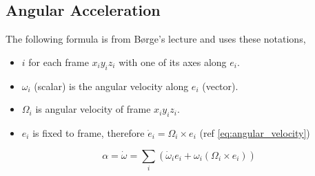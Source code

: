 \subsection{Angular Acceleration}
The following formula is from Børge's lecture and uses these notations,
\begin{itemize}
    \item $i$ for each frame $x_iy_iz_i$ with one of its axes along $e_i$.
    \item $\omega_i$ (scalar) is the angular velocity along $e_i$ (vector).
    \item $\Omega_i$ is angular velocity of frame $x_iy_iz_i$.
    \item $e_i$ is fixed to frame, therefore $\Dot{e}_i = \Omega_i \times e_i$ (ref \ref{eq:angular_velocity})
\end{itemize}

\begin{equation}
    \alpha = \Dot{\omega} = \sum_i (\Dot{\omega}_i e_i + \omega_i (\Omega_i \times e_i))
\end{equation}